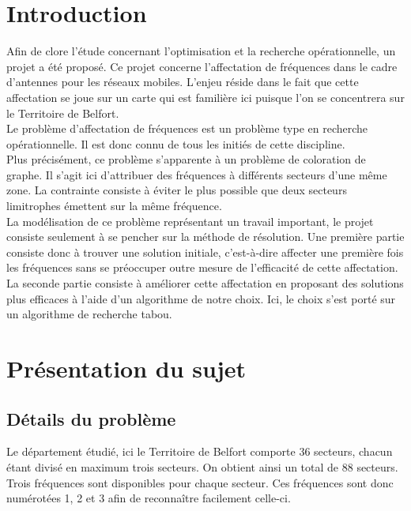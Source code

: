 \documentclass[a4paper, 11pt]{report}
\begin{document}
\chapter{Introduction}
Afin de clore l'étude concernant l'optimisation et la recherche opérationnelle, un projet a été proposé. Ce projet concerne l'affectation de fréquences dans le cadre d'antennes pour les réseaux mobiles. L'enjeu réside dans le fait que cette affectation se joue sur un carte qui est familière ici puisque l'on se concentrera sur le Territoire de Belfort.\\
Le problème d'affectation de fréquences est un problème type en recherche opérationnelle. Il est donc connu de tous les initiés de cette discipline.\\
Plus précisément, ce problème s'apparente à un problème de coloration de graphe. Il s'agit ici d'attribuer des fréquences à différents secteurs d'une même zone. La contrainte consiste à éviter le plus possible que deux secteurs limitrophes émettent sur la même fréquence.\\
La modélisation de ce problème représentant un travail important, le projet consiste seulement à se pencher sur la méthode de résolution. Une première partie consiste donc à trouver une solution initiale, c'est-à-dire affecter une première fois les fréquences sans se préoccuper outre mesure de l'efficacité de cette affectation. La seconde partie consiste à améliorer cette affectation en proposant des solutions plus efficaces à l'aide d'un algorithme de notre choix. Ici, le choix s'est porté sur un algorithme de recherche tabou.

\chapter{Présentation du sujet}

	\section{Détails du problème}
	Le département étudié, ici le Territoire de Belfort comporte 36 secteurs, chacun étant divisé en maximum trois secteurs. On obtient ainsi un total de 88 secteurs. Trois fréquences sont disponibles pour chaque secteur. Ces fréquences sont donc numérotées 1, 2 et 3 afin de reconna\^itre facilement celle-ci. \\
\end{document}
